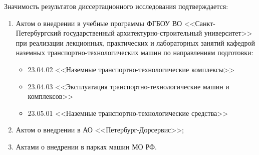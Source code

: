 {\realize} Значимость результатов диссертационного исследования подтверждается:
\begin{enumerate}[beginpenalty=10000, midpenalty=10000, wide=\parindent, leftmargin=0pt]
	\item Актом о внедрении в учебные программы ФГБОУ ВО <<Санкт-Петербургский государственный архитектурно-строительный университет>> при реализации лекционных, практических и лабораторных занятий кафедрой наземных транспортно-технологических машин по направлениям подготовки:
        \begin{itemize}[beginpenalty=10000, midpenalty=10000, wide=\parindent, leftmargin=0pt]
            \item 23.04.02 <<Наземные транспортно-технологические комплексы>>
            \item 23.04.03 <<Эксплуатация транспортно-технологические машин и комплексов>>
            \item 23.05.01 <<Наземные транспортно-технологические средства>>
        \end{itemize}
    \item Актом о внедрении в АО <<Петербург-Дорсервис>>;
	\item Актами о внедрении в парках машин МО РФ.
\end{enumerate}

